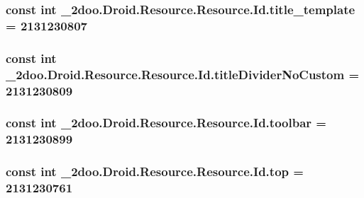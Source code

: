\hypertarget{class__2doo_1_1_droid_1_1_resource_1_1_id_f607fc8bf92ed1c22e3d3aa8aad0a61a}{
\subsubsection[{title\_\-template}]{\setlength{\rightskip}{0pt plus 5cm}const int \_\-2doo.Droid.Resource.Resource.Id.title\_\-template = 2131230807}}
\label{class__2doo_1_1_droid_1_1_resource_1_1_id_f607fc8bf92ed1c22e3d3aa8aad0a61a}


\hypertarget{class__2doo_1_1_droid_1_1_resource_1_1_id_763b64b8b23aa10394c5a8ad5e42cc94}{
\subsubsection[{titleDividerNoCustom}]{\setlength{\rightskip}{0pt plus 5cm}const int \_\-2doo.Droid.Resource.Resource.Id.titleDividerNoCustom = 2131230809}}
\label{class__2doo_1_1_droid_1_1_resource_1_1_id_763b64b8b23aa10394c5a8ad5e42cc94}


\hypertarget{class__2doo_1_1_droid_1_1_resource_1_1_id_9546bd8a7d2dd6efb918e89fa21b5f0a}{
\subsubsection[{toolbar}]{\setlength{\rightskip}{0pt plus 5cm}const int \_\-2doo.Droid.Resource.Resource.Id.toolbar = 2131230899}}
\label{class__2doo_1_1_droid_1_1_resource_1_1_id_9546bd8a7d2dd6efb918e89fa21b5f0a}


\hypertarget{class__2doo_1_1_droid_1_1_resource_1_1_id_0788283893dd4e5ef5c4938c197a7230}{
\subsubsection[{top}]{\setlength{\rightskip}{0pt plus 5cm}const int \_\-2doo.Droid.Resource.Resource.Id.top = 2131230761}}
\label{class__2doo_1_1_droid_1_1_resource_1_1_id_0788283893dd4e5ef5c4938c197a7230}



